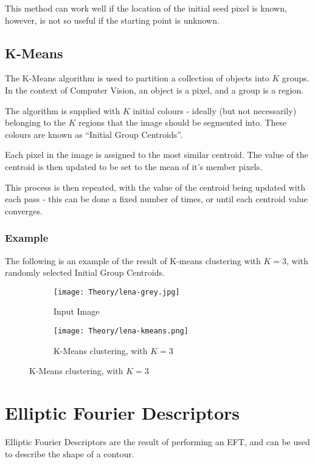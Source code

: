 This method can work well if the location of the initial seed pixel is known, however, is not so useful if the starting point is unknown.

\subsection{K-Means}
\label{sec:kmeans}
The K-Means algorithm is used to partition a collection of objects into $K$ groups. In the context of Computer Vision, an object is a pixel, and a group is a region.

The algorithm is supplied with $K$ initial colours - ideally (but not necessarily) belonging to the $K$ regions that the image should be segmented into. These colours are known as ``Initial Group Centroids''.

Each pixel in the image is assigned to the most similar centroid. The value of the centroid is then updated to be set to the mean of it's member pixels.

This process is then repeated, with the value of the centroid being updated with each pass - this can be done a fixed number of times, or until each centroid value converges.

\subsubsection{Example}
The following is an example of the result of K-means clustering with $K = 3$, with randomly selected Initial Group Centroids.

\begin{figure}[H]
    \centering
    \begin{subfigure}[b]{0.45\textwidth}
        \centering
        \texttt{[image: Theory/lena-grey.jpg]}
        \caption{Input Image}
    \end{subfigure}
    \begin{subfigure}[b]{0.45\textwidth}
        \centering
        \texttt{[image: Theory/lena-kmeans.png]}
        \caption{K-Means clustering, with $K = 3$}
    \end{subfigure}
\end{figure}

\section{Elliptic Fourier Descriptors}
Elliptic Fourier Descriptors are the result of performing an \ac{EFT}, and can be used to describe the shape of a contour.

